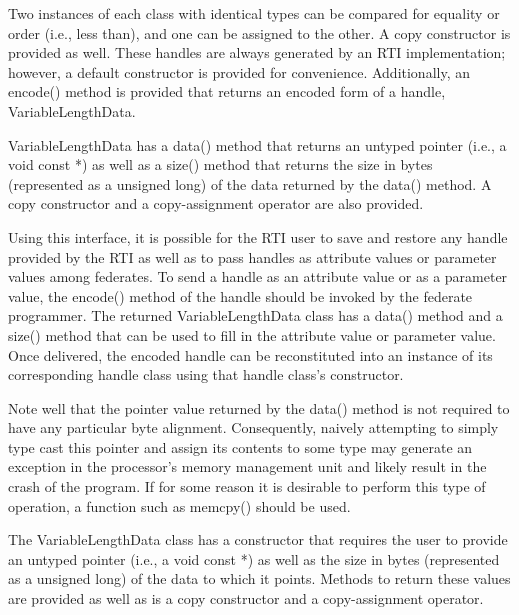 \begin{compactstdpage}
    Two instances of each class with identical types can be compared for equality or order (i.e., less than), and one can be assigned to the other. A copy constructor is provided as well. These handles are always generated by an RTI implementation; however, a default constructor is provided for convenience. Additionally, an encode() method is provided that returns an encoded form of a handle, VariableLengthData.

    VariableLengthData has a data() method that returns an untyped pointer (i.e., a void const *) as well as a size() method that returns the size in bytes (represented as a unsigned long) of the data returned by the data() method. A copy constructor and a copy-assignment operator are also provided.

    Using this interface, it is possible for the RTI user to save and restore any handle provided by the RTI as well as to pass handles as attribute values or parameter values among federates. To send a handle as an attribute value or as a parameter value, the encode() method of the handle should be invoked by the federate programmer. The returned VariableLengthData class has a data() method and a size() method that can be used to fill in the attribute value or parameter value. Once delivered, the encoded handle can be reconstituted into an instance of its corresponding handle class using that handle class's constructor.

    Note well that the pointer value returned by the data() method is not required to have any particular byte alignment. Consequently, naively attempting to simply type cast this pointer and assign its contents to some type may generate an exception in the processor's memory management unit and likely result in the crash of the program. If for some reason it is desirable to perform this type of operation, a function such as memcpy() should be used.

    The VariableLengthData class has a constructor that requires the user to provide an untyped pointer (i.e., a void const *) as well as the size in bytes (represented as a unsigned long) of the data to which it points. Methods to return these values are provided as well as is a copy constructor and a copy-assignment operator.

\end{compactstdpage}

\clearpage

